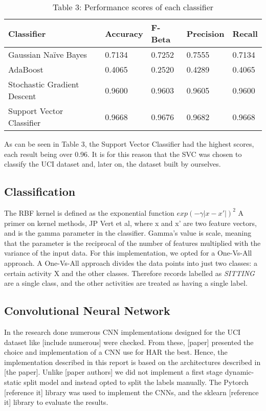         \begin{table}[ht]
            \centering\footnotesize
            \begin{tabular}{|l|l|l|l|l|}
                \hline
                \textbf{Classifier} & \textbf{Accuracy} & \textbf{F-Beta}  & \textbf{Precision} & \textbf{Recall} \\ \hline
                Gaussian Naïve Bayes             & 0.7134           & 0.7252  & 0.7555 & 0.7134 \\ \hline
                AdaBoost            & 0.4065           & 0.2520 & 0.4289 & 0.4065 \\ \hline
                Stochastic Gradient Descent               & 0.9600           & 0.9603 & 0.9605 & 0.9600 \\ \hline
                Support Vector Classifier            & 0.9668           & 0.9676 & 0.9682 & 0.9668 \\ \hline
            \end{tabular}
            \caption*{Table 3: Performance scores of each classifier}
        \end{table}

        As can be seen in Table 3, the Support Vector Classifier had the highest scores, each result being over 0.96. It is for this reason that the SVC
        was chosen to classify the UCI dataset \cite{Anguita2013} and, later on, the dataset built by ourselves.

    \subsection{Classification}
        The RBF kernel is defined as the exponential function \(exp(-\gamma \lvert x-x' \rvert)^2\) A primer on kernel methods, JP Vert et al, where x and x’ are two feature vectors, and is the
        gamma parameter in the classifier. Gamma’s value is scale, meaning that the parameter is the reciprocal of the number of features multiplied with the variance of the input data.
        For this implementation, we opted for a One-Vs-All approach. A One-Vs-All approach divides the data points into just two classes: a certain activity X and the other classes. Therefore records
        labelled as \emph{SITTING} are a single class, and the other activities are treated as having a single label.

\subsection{Convolutional Neural Network}
    In the research done numerous CNN implementations designed for the UCI dataset like [include numerous] were checked.
    From these, [paper] presented the choice and implementation of a CNN use for HAR the best.
    Hence, the implementation described in this report is based on the architectures described in [the paper].
    Unlike [paper authors] we did not  implement a first stage dynamic-static split model and instead opted to split the labels manually.
    The Pytorch [reference it] library was used to implement the CNNs, and the sklearn [reference it] library to evaluate the results.

